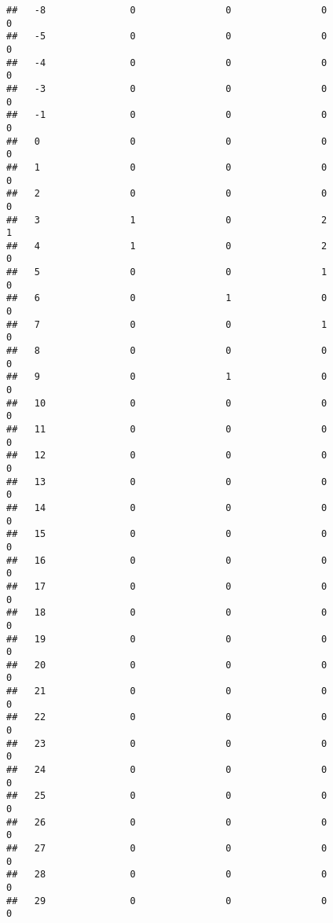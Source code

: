 \documentclass[]{article}
\begin{document}
\begin{verbatim}
##   -8               0                0                0                0
##   -5               0                0                0                0
##   -4               0                0                0                0
##   -3               0                0                0                0
##   -1               0                0                0                0
##   0                0                0                0                0
##   1                0                0                0                0
##   2                0                0                0                0
##   3                1                0                2                1
##   4                1                0                2                0
##   5                0                0                1                0
##   6                0                1                0                0
##   7                0                0                1                0
##   8                0                0                0                0
##   9                0                1                0                0
##   10               0                0                0                0
##   11               0                0                0                0
##   12               0                0                0                0
##   13               0                0                0                0
##   14               0                0                0                0
##   15               0                0                0                0
##   16               0                0                0                0
##   17               0                0                0                0
##   18               0                0                0                0
##   19               0                0                0                0
##   20               0                0                0                0
##   21               0                0                0                0
##   22               0                0                0                0
##   23               0                0                0                0
##   24               0                0                0                0
##   25               0                0                0                0
##   26               0                0                0                0
##   27               0                0                0                0
##   28               0                0                0                0
##   29               0                0                0                0

\end{verbatim}
\end{document}
